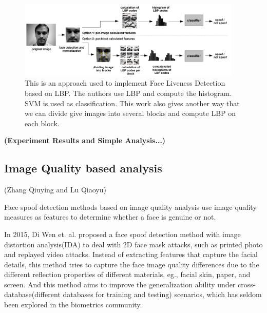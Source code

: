 \documentclass[journal]{IEEEtran}
\begin{document}
\begin{figure}[htbp]
\centering
\includegraphics[width=0.95\textwidth]{img/2-A-(1).png}
\caption{This is an approach \cite{chingovska2012effectiveness} used to implement Face Liveness Detection based on LBP. The authors use LBP and compute the histogram. SVM is used as classification. This work also gives another way that we can divide give images into several blocks and compute LBP on each block.}
\label{lbp_based_approach}
\end{figure}

\bigskip

\textbf{(Experiment Results and Simple Analysis...)}


\subsection{Image Quality based analysis}

(Zhang Qiuying and Lu Qiaoyu)

Face spoof detection methods based on image quality analysis use image quality measures as features to determine whether a face is genuine or not.

In 2015, Di Wen et. al.\cite{wen2015face} proposed a face spoof detection method with image distortion analysis(IDA) to deal with 2D face mask attacks, such as printed photo and replayed video attacks. Instead of extracting features that capture the facial details, this method tries to capture the face image quality differences due to the different reflection properties of different materials, eg., facial skin, paper, and screen. And this method aims to improve the generalization ability under cross-database(different databases for training and testing) scenarios, which has seldom been explored in the biometrics community.
\end{document}
